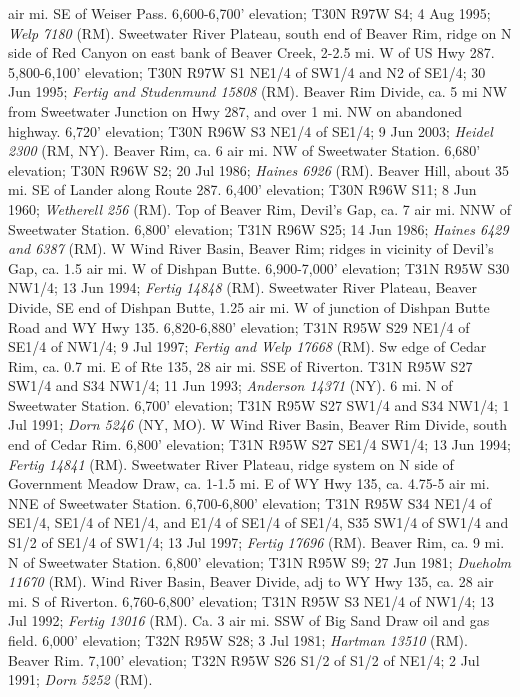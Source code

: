 air mi. SE of Weiser Pass. 6,600-6,700' elevation; T30N R97W S4; 4 Aug 1995; \textit{Welp 7180} (RM).  Sweetwater River Plateau, south end of Beaver Rim, ridge on N side of Red Canyon on east bank of Beaver Creek, 2-2.5 mi. W of US Hwy 287. 5,800-6,100' elevation; T30N R97W S1 NE1/4 of SW1/4 and N2 of SE1/4; 30 Jun 1995; \textit{Fertig and Studenmund 15808} (RM).  Beaver Rim Divide, ca. 5 mi NW from Sweetwater Junction on Hwy 287, and over 1 mi. NW on abandoned highway. 6,720' elevation; T30N R96W S3 NE1/4 of SE1/4; 9 Jun 2003; \textit{Heidel 2300} (RM, NY).  Beaver Rim, ca. 6 air mi. NW of Sweetwater Station. 6,680' elevation; T30N R96W S2; 20 Jul 1986; \textit{Haines 6926} (RM).  Beaver Hill, about 35 mi. SE of Lander along Route 287. 6,400' elevation; T30N R96W S11; 8 Jun 1960; \textit{Wetherell 256} (RM).  Top of Beaver Rim, Devil's Gap, ca. 7 air mi. NNW of Sweetwater Station. 6,800' elevation; T31N R96W S25; 14 Jun 1986; \textit{Haines 6429 and 6387} (RM).  W Wind River Basin, Beaver Rim; ridges in vicinity of Devil's Gap, ca. 1.5 air mi. W of Dishpan Butte. 6,900-7,000' elevation; T31N R95W S30 NW1/4; 13 Jun 1994; \textit{Fertig 14848} (RM).  Sweetwater River Plateau, Beaver Divide, SE end of Dishpan Butte, 1.25 air mi. W of junction of Dishpan Butte Road and WY Hwy 135. 6,820-6,880' elevation; T31N R95W S29 NE1/4 of SE1/4 of NW1/4; 9 Jul 1997; \textit{Fertig and Welp 17668} (RM).  Sw edge of Cedar Rim, ca. 0.7 mi. E of Rte 135, 28 air mi. SSE of Riverton.  T31N R95W S27 SW1/4 and S34 NW1/4; 11 Jun 1993; \textit{Anderson 14371} (NY).  6 mi. N of Sweetwater Station. 6,700' elevation; T31N R95W S27 SW1/4 and S34 NW1/4; 1 Jul 1991; \textit{Dorn 5246} (NY, MO).  W Wind River Basin, Beaver Rim Divide, south end of Cedar Rim. 6,800' elevation; T31N R95W S27 SE1/4 SW1/4; 13 Jun 1994; \textit{Fertig 14841} (RM).  Sweetwater River Plateau, ridge system on N side of Government Meadow Draw, ca. 1-1.5 mi. E of WY Hwy 135, ca. 4.75-5 air mi. NNE of Sweetwater Station. 6,700-6,800' elevation; T31N R95W S34 NE1/4 of SE1/4, SE1/4 of NE1/4, and E1/4 of SE1/4 of SE1/4, S35 SW1/4 of SW1/4 and S1/2 of SE1/4 of SW1/4; 13 Jul 1997; \textit{Fertig 17696} (RM).  Beaver Rim, ca. 9 mi. N of Sweetwater Station. 6,800' elevation; T31N R95W S9; 27 Jun 1981; \textit{Dueholm 11670} (RM).  Wind River Basin, Beaver Divide, adj to WY Hwy 135, ca. 28 air mi. S of Riverton. 6,760-6,800' elevation; T31N R95W S3 NE1/4 of NW1/4; 13 Jul 1992; \textit{Fertig 13016} (RM).  Ca. 3 air mi. SSW of Big Sand Draw oil and gas field. 6,000' elevation; T32N R95W S28; 3 Jul 1981; \textit{Hartman 13510} (RM).  Beaver Rim. 7,100' elevation; T32N R95W S26 S1/2 of S1/2 of NE1/4; 2 Jul 1991; \textit{Dorn 5252} (RM).


